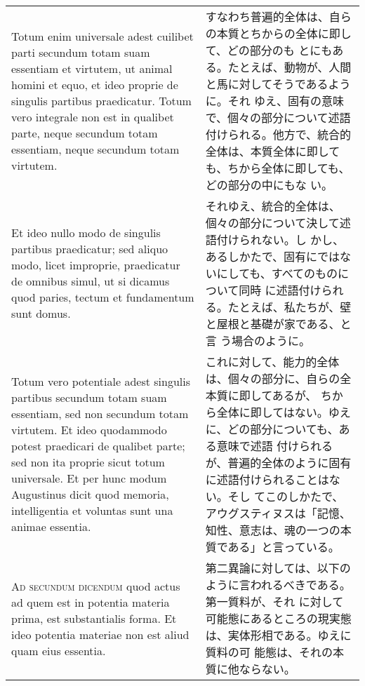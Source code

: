 \documentclass[paper=a4paper,fontsize=10pt,jafontsize=9pt,titlepage]{jlreq}
\begin{document}
\begin{longtable}{p{21em}p{21em}}
\\

 Totum enim universale adest cuilibet parti secundum totam suam
essentiam et virtutem, ut animal homini et equo, et ideo proprie de
singulis partibus praedicatur. Totum vero integrale non est in
qualibet parte, neque secundum totam essentiam, neque secundum totam
virtutem.

&

 すなわち普遍的全体は、自らの本質とちからの全体に即して、どの部分のも
 とにもある。たとえば、動物が、人間と馬に対してそうであるように。それ
 ゆえ、固有の意味で、個々の部分について述語付けられる。他方で、統合的
 全体は、本質全体に即しても、ちから全体に即しても、どの部分の中にもな
 い。


\\


 Et ideo nullo modo de singulis partibus praedicatur; sed aliquo modo,
licet improprie, praedicatur de omnibus simul, ut si dicamus quod
paries, tectum et fundamentum sunt domus. 

&

 それゆえ、統合的全体は、個々の部分について決して述語付けられない。し
 かし、あるしかたで、固有にではないにしても、すべてのものについて同時
 に述語付けられる。たとえば、私たちが、壁と屋根と基礎が家である、と言
 う場合のように。


\\

Totum vero potentiale adest singulis partibus secundum totam suam
essentiam, sed non secundum totam virtutem.  Et ideo quodammodo potest
praedicari de qualibet parte; sed non ita proprie sicut totum
universale. Et per hunc modum Augustinus dicit quod memoria,
intelligentia et voluntas sunt una animae essentia.

&

 これに対して、能力的全体は、個々の部分に、自らの全本質に即してあるが、
 ちから全体に即してはない。ゆえに、どの部分についても、ある意味で述語
 付けられるが、普遍的全体のように固有に述語付けられることはない。そし
 てこのしかたで、アウグスティヌスは「記憶、知性、意志は、魂の一つの本
 質である」と言っている。


\\


{\scshape Ad secundum dicendum} quod actus ad quem est in potentia
materia prima, est substantialis forma. Et ideo potentia materiae non
est aliud quam eius essentia.

&

 第二異論に対しては、以下のように言われるべきである。第一質料が、それ
 に対して可能態にあるところの現実態は、実体形相である。ゆえに質料の可
 能態は、それの本質に他ならない。


\end{longtable}
\end{document}
